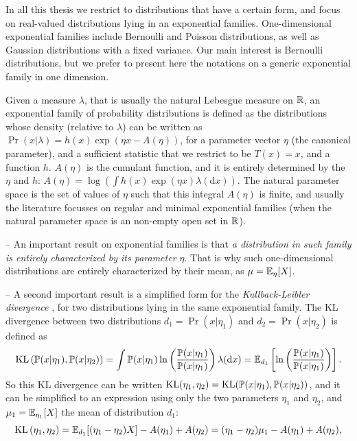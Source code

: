 In all this thesis we restrict to distributions that have a certain form, and focus on real-valued distributions lying in an exponential families.
One-dimensional exponential families include Bernoulli and Poisson distributions, as well as Gaussian distributions with a fixed variance.
Our main interest is Bernoulli distributions, but we prefer to present here the notations on a generic exponential family in one dimension.

Given a measure $\lambda$, that is usually the natural Lebesgue measure on $\mathbb{R}$, an exponential family of probability distributions is defined as the distributions whose density (relative to $\lambda$) can be written as
$ \Pr(x | \lambda) = h(x) \exp \left( \eta x - A(\eta) \right)$,
for a parameter vector $\eta$ (the canonical parameter), and a sufficient statistic that we restrict to be $T(x)=x$, and a function $h$.
$A(\eta)$ is the cumulant function, and it is entirely determined by the $\eta$ and $h$:
$A(\eta) = \log \left( \int h(x) \exp(\eta x) \lambda(\mathrm{d} x) \right)$.
%
The natural parameter space is the set of values of $\eta$ such that this integral $A(\eta)$ is finite,
and usually the literature focusses on regular and minimal exponential families (when the natural parameter space is an non-empty open set in $\mathbb{R}$).

-- An important result on exponential families is that \emph{a distribution in such family is entirely characterized by its parameter $\eta$}.
That is why such one-dimensional distributions are entirely characterized by their mean, as $\mu = \mathbb{E}_{\eta}[X]$.

-- A second important result is a simplified form for the \emph{Kullback-Leibler divergence} \cite{KullbackLeibler51}, for two distributions lying in the same exponential family.
The KL divergence between two distributions $d_1=\Pr(x|\eta_1)$ and $d_2=\Pr(x|\eta_2)$ is defined as
\begin{equation}\label{eq:2:Kullback-LeiblerDivergenceExpFamily1}
    \mathrm{KL}\left(\mathbb{P}(x|\eta_1), \mathbb{P}(x|\eta_2)\right) = \int \mathbb{P}(x|\eta_1) \ln\left(\frac{\mathbb{P}(x|\eta_1)}{\mathbb{P}(x|\eta_1)}\right) \lambda(\mathrm{d}x) = \mathbb{E}_{d_1} \left[ \ln\left(\frac{\mathbb{P}(x|\eta_1)}{\mathbb{P}(x|\eta_1)}\right) \right].
\end{equation}
%
So this KL divergence can be written $\mathrm{KL}( \eta_1, \eta_2 ) = \mathrm{KL}(\mathbb{P}(x|\eta_1), \mathbb{P}(x|\eta_2))$, and it can be simplified to an expression using only the two parameters $\eta_1$ and $\eta_2$,
and $\mu_1 = \mathbb{E}_{\eta_1}[X]$ the mean of distribution $d_1$:
%
\begin{equation}\label{eq:2:Kullback-LeiblerDivergenceExpFamily2}
    \mathrm{KL}\left( \eta_1, \eta_2 \right) = \mathbb{E}_{d_1}[ (\eta_1 - \eta_2) X ] - A(\eta_1) + A(\eta_2) = (\eta_1 - \eta_2) \mu_1 - A(\eta_1) + A(\eta_2),
\end{equation}


